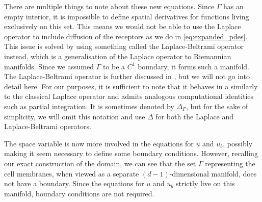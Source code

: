 There are multiple things to note about these new equations. Since $\Gamma$ has an empty interior, it is impossible to define spatial derivatives for functions living exclusively on this set. This means we would not be able to use the Laplace operator to include diffusion of the receptors as we do in \cref{eq:expanded_pdes}. This issue is solved by using something called the Laplace-Beltrami operator instead, which is a generalisation of the Laplace operator to Riemannian manifolds. Since we assumed $\Gamma$ to be a $C^1$ boundary, it forms such a manifold. The Laplace-Beltrami operator is further discussed in \cite{jost2017riemannian}, but we will not go into detail here. For our purposes, it is sufficient to note that it behaves in a similarly to the classical Laplace operator and admits analogous computational identities such as partial integration. It is sometimes denoted by $\Delta_\Gamma$, but for the sake of simplicity, we will omit this notation and use $\Delta$ for both the Laplace and Laplace-Beltrami operators.

The space variable is now more involved in the equations for $u$ and $u_b$, possibly making it seem necessary to define some boundary conditions. However, recalling our exact construction of the domain, we can see that the set $\Gamma$ representing the cell membranes, when viewed as a separate $(d - 1)$-dimensional manifold, does not have a boundary. Since the equations for $u$ and $u_b$ strictly live on this manifold, boundary conditions are not required.